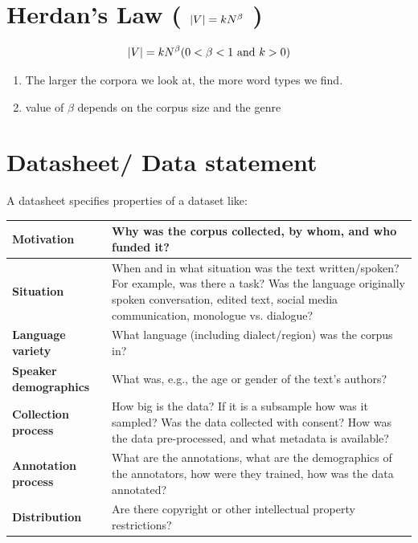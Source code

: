 \section{Herdan’s Law ( $\left| V \right| = kN^{\beta}$ ) \cite{nlp-1}} \label{Herdan’s Law}

\[
    \dabs{V} = kN^{\beta} \hfill (0 < \beta < 1 \text{ and } k > 0)
\]

\begin{enumerate}
    \item The larger the corpora we look at, the more word types we find.
    \item value of $\beta$ depends on the corpus size and the genre
\end{enumerate}

\section{Datasheet/ Data statement}\label{Datasheet/ Data statement}

A datasheet specifies properties of a dataset like:
\begin{customTableWrapper}{1.3}
\begin{table}[h]
    \centering
    \begin{tabular}{|m{3.5cm}|m{11.5cm}|}
        \hline
        
        \textbf{Motivation} & Why was the corpus collected, by whom, and who funded it?  \\ 
        \hline
         
         \textbf{Situation} & When and in what situation was the text written/spoken? For example, was there a task? Was the language originally spoken conversation, edited text, social media communication, monologue vs. dialogue? \\
         \hline
         
        \textbf{Language variety} & What language (including dialect/region) was the corpus in? \\
        \hline
        
        \textbf{Speaker demographics} & What was, e.g., the age or gender of the text’s authors? \\
        \hline
        
        \textbf{Collection process} & How big is the data? If it is a subsample how was it sampled? Was the data collected with consent? How was the data pre-processed, and what metadata is available? \\
        \hline

        \textbf{Annotation process} & What are the annotations, what are the demographics of the annotators, how were they trained, how was the data annotated? \\ 
        \hline

        \textbf{Distribution} & Are there copyright or other intellectual property restrictions?\\
        \hline
        
    \end{tabular}
\end{table}
\end{customTableWrapper}

